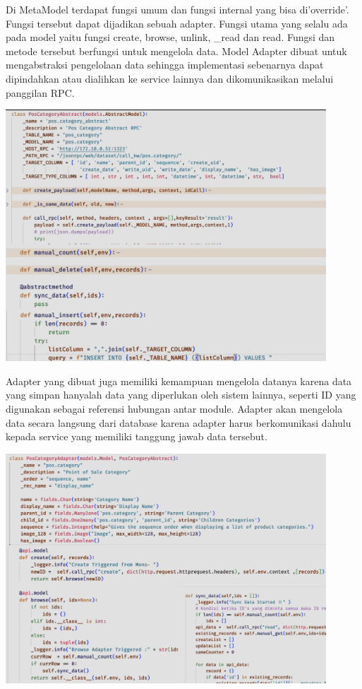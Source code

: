 Di MetaModel terdapat fungsi umum dan fungsi internal yang bisa di'override'. Fungsi tersebut dapat dijadikan sebuah adapter. Fungsi utama yang selalu ada pada model yaitu fungsi create, browse, unlink, \_read dan read. Fungsi dan metode tersebut berfungsi untuk mengelola data. Model Adapter dibuat untuk mengabstraksi pengelolaan data sehingga implementasi sebenarnya dapat dipindahkan atau dialihkan ke service lainnya dan dikomunikasikan melalui panggilan RPC.  


\begin{center}
	\includegraphics[width=12cm]{img/bab_4/strangle_1.png}
	\label{fig:strangle_1}
\end{center}

Adapter yang dibuat juga memiliki kemampuan mengelola datanya karena data yang simpan hanyalah data yang diperlukan oleh sistem lainnya, seperti ID yang digunakan sebagai referensi hubungan antar module. Adapter akan mengelola data secara langsung dari database karena adapter harus berkomunikasi dahulu kepada service yang memiliki tanggung jawab data tersebut.


\begin{center}
	\includegraphics[width=12cm]{img/bab_4/strangle_2.png}
	\label{fig:strangle_2}
\end{center}

